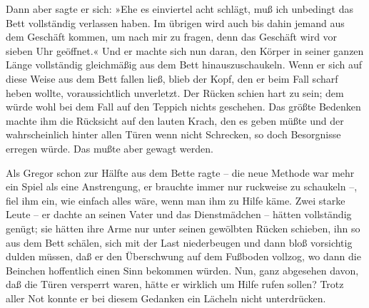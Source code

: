 Dann aber sagte er sich: »Ehe es einviertel acht schlägt, muß ich
unbedingt das Bett vollständig verlassen haben. Im übrigen wird auch bis
dahin jemand aus dem Geschäft kommen, um nach mir zu fragen, denn das
Geschäft wird vor sieben Uhr geöffnet.« Und er machte sich nun daran,
den Körper in seiner ganzen Länge vollständig gleichmäßig aus dem Bett
hinauszuschaukeln. Wenn er sich auf diese Weise aus dem Bett fallen
ließ, blieb der Kopf, den er beim Fall scharf heben wollte,
voraussichtlich unverletzt. Der Rücken schien hart zu sein; dem würde
wohl bei dem Fall auf den Teppich nichts geschehen. Das größte Bedenken
machte ihm die Rücksicht auf den lauten Krach, den es geben müßte und
der wahrscheinlich hinter allen Türen wenn nicht Schrecken, so doch
Besorgnisse erregen würde. Das mußte aber gewagt werden.

Als Gregor schon zur Hälfte aus dem Bette ragte -- die neue Methode war
mehr ein Spiel als eine Anstrengung, er brauchte immer nur ruckweise zu
schaukeln --, fiel ihm ein, wie einfach alles wäre, wenn man ihm zu
Hilfe käme. Zwei starke Leute -- er dachte an seinen Vater und das
Dienstmädchen -- hätten vollständig genügt; sie hätten ihre Arme nur
unter seinen gewölbten Rücken schieben, ihn so aus dem Bett schälen,
sich mit der Last niederbeugen und dann bloß vorsichtig dulden müssen,
daß er den Überschwung auf dem Fußboden vollzog, wo dann die Beinchen
hoffentlich einen Sinn bekommen würden. Nun, ganz abgesehen davon, daß
die Türen versperrt waren, hätte er wirklich um Hilfe rufen sollen?
Trotz aller Not konnte er bei diesem Gedanken ein Lächeln nicht
unterdrücken.

